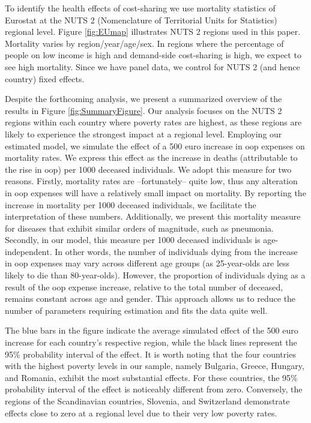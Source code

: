 \documentclass[a4paper,12pt]{article}
\begin{document}
To identify the health effects of cost-sharing we use mortality statistics of Eurostat at the NUTS 2 (Nomenclature of Territorial Units for Statistics) regional level. Figure \ref{fig:EUmap} illustrates NUTS 2 regions used in this paper. Mortality varies by region/year/age/sex. In regions where the percentage of people on low income is high and demand-side cost-sharing is high, we expect to see high mortality. Since we have panel data, we control for NUTS 2 (and hence country) fixed effects.

Despite the forthcoming analysis, we present a summarized overview of the results in Figure \ref{fig:SummaryFigure}. Our analysis focuses on the NUTS 2 regions within each country where poverty rates are highest, as these regions are likely to experience the strongest impact at a regional level. Employing our estimated model, we simulate the effect of a 500 euro increase in oop expenses on mortality rates. We express this effect as the increase in deaths (attributable to the rise in oop) per 1000 deceased individuals. We adopt this measure for two reasons. Firstly, mortality rates are --fortunately-- quite low, thus any alteration in oop expenses will have a relatively small impact on mortality. By reporting the increase in mortality per 1000 deceased individuals, we facilitate the interpretation of these numbers. Additionally, we present this mortality measure for diseases that exhibit similar orders of magnitude, such as pneumonia. Secondly, in our model, this measure per 1000 deceased individuals is age-independent. In other words, the number of individuals dying from the increase in oop expenses may vary across different age groups (as 25-year-olds are less likely to die than 80-year-olds). However, the proportion of individuals dying as a result of the oop expense increase, relative to the total number of deceased, remains constant across age and gender. This approach allows us to reduce the number of parameters requiring estimation and fits the data quite well.

The blue bars in the figure indicate the average simulated effect of the 500 euro increase for each country's respective region, while the black lines represent the 95\% probability interval of the effect. It is worth noting that the four countries with the highest poverty levels in our sample, namely Bulgaria, Greece, Hungary, and Romania, exhibit the most substantial effects. For these countries, the 95\% probability interval of the effect is noticeably different from zero. Conversely, the regions of the Scandinavian countries, Slovenia, and Switzerland demonstrate effects close to zero at a regional level due to their very low poverty rates.
\end{document}
